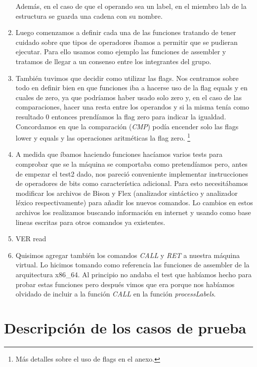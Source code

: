 \documentclass[a4paper,12pt]{article}
\begin{document}
\begin{enumerate}
Adem\'as, en el caso de que el operando sea un label, en el miembro lab de la estructura se guarda una cadena con su nombre. 
\item
Luego comenzamos a definir cada una de las funciones tratando de tener cuidado sobre que tipos de operadores \'ibamos a permitir que se pudieran ejecutar. Para ello usamos como ejemplo las funciones de assembler y tratamos de llegar a un consenso entre los integrantes del grupo.
\item
Tambi\'en tuvimos que decidir como utilizar las flags. Nos centramos sobre todo en definir bien en que funciones iba a hacerse uso de la flag equals y en cuales de zero, ya que podr\'iamos haber usado solo zero y, en el caso de las comparaciones, hacer una resta entre los operandos y si la misma ten\'ia como resultado 0 entonces prend\'iamos la flag zero para indicar la igualdad. Concordamos en que la comparaci\'on (\emph{CMP}) pod\'ia encender solo las flags lower y equals y las operaciones aritm\'eticas la flag zero. 
\footnote{M\'as detalles sobre el uso de flags en el anexo.}
\item A medida que \'ibamos haciendo funciones hac\'iamos varios tests para comprobar que se la m\'aquina se comportaba como pretend\'iamos pero, antes de empezar el test2 dado, nos pareci\'o conveniente implementar instrucciones de operadores de bits como caracter\'istica adicional. Para esto necesit\'abamos modificar los archivos de Bison y Flex (analizador sint\'actico y analizador l\'exico respectivamente) para añadir los nuevos comandos. Lo cambios en estos archivos los realizamos buscando informaci\'on en internet y usando como base lineas escritas para otros comandos ya existentes.
\item
 VER read
\item
Quisimos agregar tambi\'en los comandos \emph{CALL} y \emph{RET} a nuestra m\'aquina virtual. Lo hicimos tomando como referencia las funciones de assembler de la arquitectura x86\_64. Al principio no andaba el test que hab\'iamos hecho para probar estas funciones pero despu\'es vimos que era porque nos hab\'iamos olvidado de incluir a la funci\'on \emph{CALL} en la funci\'on \emph{processLabels}. 
\end{enumerate}

\section{Descripci\'on de los casos de prueba}
\end{document}
